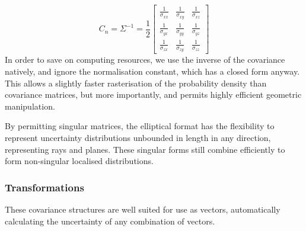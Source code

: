 \documentclass[a4paper, 11pt, titlepage]{article}
\begin{document}
      \begin{equation}
      C_n = \Sigma^{-1}= \frac{1}{2}\begin{bmatrix}
        \frac{1}{\sigma_{xx}} & \frac{1}{\sigma_{xy}} & \frac{1}{\sigma_{xz}} \\[0.3em]
        \frac{1}{\sigma_{yx}} & \frac{1}{\sigma_{yy}} & \frac{1}{\sigma_{yz}} \\[0.3em]
        \frac{1}{\sigma_{zx}} & \frac{1}{\sigma_{zy}} & \frac{1}{\sigma_{zz}} 
      \end{bmatrix}
      \end{equation}
      In order to save on computing resources, we use the inverse of the covariance natively, and ignore the normalisation constant, which has a closed form anyway.
      This allows a slightly faster rasterisation of the probability density than covariance matrices, but more importantly, and permits highly efficient geometric manipulation.

      By permitting singular matrices, the elliptical format has the flexibility to represent uncertainty distributions unbounded in length in any direction, representing rays and planes.  These singular forms still combine efficiently to form non-singular localised distributions.
      
    \subsubsection{Transformations}
      These covariance structures are well suited for use as vectors, automatically calculating the uncertainty of any combination of vectors.
      
\end{document}
